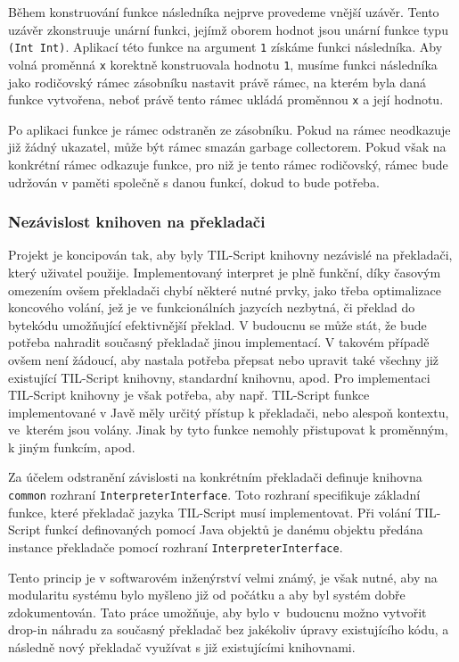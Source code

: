 Během konstruování funkce následníka nejprve provedeme vnější uzávěr. Tento uzávěr zkonstruuje
unární funkci, jejímž oborem hodnot jsou unární funkce typu \lstinline{(Int Int)}. Aplikací této
funkce na argument \lstinline{1} získáme funkci následníka. Aby volná proměnná \lstinline{x}
korektně konstruovala hodnotu \lstinline{1}, musíme funkci následníka jako rodičovský rámec
zásobníku nastavit právě rámec, na kterém byla daná funkce vytvořena, neboť právě tento rámec
ukládá proměnnou \lstinline{x} a její hodnotu.

Po aplikaci funkce je rámec odstraněn ze zásobníku. Pokud na rámec neodkazuje již žádný ukazatel,
může být rámec smazán garbage collectorem. Pokud však na konkrétní rámec odkazuje funkce, pro niž
je tento rámec rodičovský, rámec bude udržován v paměti společně s danou funkcí, dokud to bude
potřeba.

\subsubsection{Nezávislost knihoven na překladači}

Projekt je koncipován tak, aby byly TIL-Script knihovny nezávislé na překladači, který uživatel
použije. Implementovaný interpret je plně funkční, díky časovým omezením ovšem překladači chybí
některé nutné prvky, jako třeba optimalizace koncového volání, jež je ve funkcionálních
jazycích nezbytná, či překlad do bytekódu umožňující efektivnější překlad. V budoucnu se může stát,
že bude potřeba nahradit současný překladač jinou implementací. V takovém případě ovšem není
žádoucí, aby nastala potřeba přepsat nebo upravit také všechny již existující TIL-Script knihovny,
standardní knihovnu, apod. Pro implementaci TIL-Script knihovny je však potřeba, aby např.
TIL-Script funkce implementované v Javě měly určitý přístup k překladači, nebo alespoň kontextu,
ve~kterém jsou volány. Jinak by tyto funkce nemohly přistupovat k proměnným, k jiným funkcím, apod.

Za účelem odstranění závislosti na konkrétním překladači definuje knihovna \lstinline{common}
rozhraní \lstinline{InterpreterInterface}. Toto rozhraní specifikuje základní funkce, které
překladač jazyka TIL-Script musí implementovat. Při volání TIL-Script funkcí definovaných pomocí
Java objektů je danému objektu předána instance překladače pomocí rozhraní
\lstinline{InterpreterInterface}.

Tento princip je v softwarovém inženýrství velmi známý, je však nutné, aby na modularitu systému
bylo myšleno již od počátku a aby byl systém dobře zdokumentován. Tato práce umožňuje, aby bylo
v~budoucnu možno vytvořit drop-in náhradu za současný překladač bez jakékoliv úpravy existujícího
kódu, a následně nový překladač využívat s již existujícími knihovnami.

\endinput
